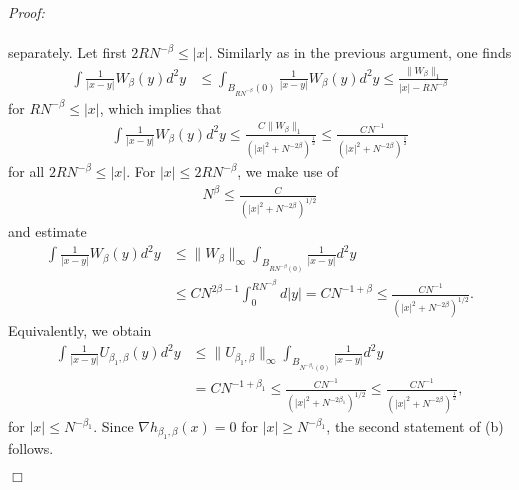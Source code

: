 \documentclass[11pt, english, american]{article}
\newenvironment{proof}{\emph{Proof:}}{\begin{flushright} $ \Box $ \end{flushright}}
\begin{document}
\begin{proof}
\begin{enumerate}
\begin{align*}
\end{align*}
separately. Let first $2R N^{-\beta} \le \vert x \vert$. Similarly as in the previous argument, one finds
\begin{align*} 
\int \frac{1}{|x-y|} W_{\beta}(y)d^2y & \leq   \int_{B_{R N^{-\beta}}(0)} \frac{1}{\vert x-y\vert} 
W_{\beta}(y)d^2y  \le \frac{\|W_\beta \|_1}{\vert x \vert - RN^{-\beta}}
\end{align*}
for $R N^{-\beta} \le \vert x \vert$, which implies that
\begin{align*}
\int \frac{1}{|x-y|} W_{\beta}(y)d^2y \le \frac{C \| W_{\beta}\|_1}{( \vert x \vert^2 + N^{-2\beta})^{\frac{1}{2}}} \le  \frac{C N^{-1}}{( \vert x \vert^2 + N^{-2\beta})^{\frac{1}{2}}} 
\end{align*}
for all $2R N^{-\beta} \le \vert x \vert$. 
For $\vert x \vert \le 2R N^{-\beta}$, we make use of
\begin{align*}
N^{\beta} \le \frac{C}{\left( \vert x \vert^2 + N^{- 2 \beta} \right)^{1/2}}
\end{align*}
and estimate
\begin{align*}
\int \frac{1}{|x-y|} W_{\beta}(y) d^2y & \le \| W_{\beta} \|_{\infty} \int_{ B_{RN^{-\beta}(0)}} \frac{1}{\vert x-y \vert } d^2y \\
& \le C N^{2\beta-1}\int_{0}^{RN^{-\beta }} d\vert y\vert = C N^{-1+\beta}
\le  \frac{C N^{-1}}{\left( \vert x \vert^2 + N^{- 2 \beta} \right)^{1/2}}  .
\end{align*}
Equivalently, we obtain
\begin{align*}
\int \frac{1}{|x-y|} U_{\beta_1,\beta}(y) d^2y & \le \| U_{\beta_1, \beta} \|_{\infty} \int_{ B_{N^{-\beta_1}(0)}} \frac{1}{\vert x-y \vert } d^2y \\
& = C N^{-1+\beta_1}
\le  \frac{C N^{-1}}{\left( \vert x \vert^2 + N^{- 2 \beta_1} \right)^{1/2}} 
\le  \frac{C N^{-1}}{( \vert x \vert^2 + N^{-2\beta})^{\frac{1}{2}}} ,
\end{align*}
for $\vert x \vert \leq N^{-\beta_1}$.
Since $\nabla h_{\beta_1,\beta}(x) = 0 $ for $\vert x \vert \geq N^{-\beta_1}$,  the second statement of (b) follows.



\end{enumerate}
\end{proof}
\end{document}

